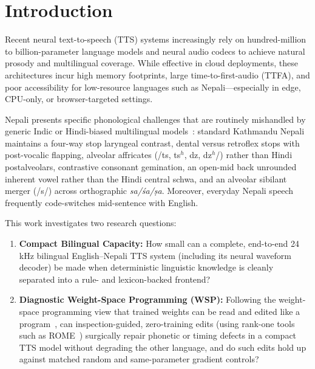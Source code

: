 \section{Introduction}
\label{sec:intro}

Recent neural text-to-speech (TTS) systems increasingly rely on hundred-million to billion-parameter language models and neural audio codecs to achieve natural prosody and multilingual coverage. While effective in cloud deployments, these architectures incur high memory footprints, large time-to-first-audio (TTFA), and poor accessibility for low-resource languages such as Nepali---especially in edge, CPU-only, or browser-targeted settings.

Nepali presents specific phonological challenges that are routinely mishandled by generic Indic or Hindi-biased multilingual models~\cite{khatiwada2009nepali}: standard Kathmandu Nepali maintains a four-way stop laryngeal contrast, dental versus retroflex stops with post-vocalic flapping, alveolar affricates (/ts, ts$^h$, dz, dz$^h$/) rather than Hindi postalveolars, contrastive consonant gemination, an open-mid back unrounded inherent vowel rather than the Hindi central schwa, and an alveolar sibilant merger (/s/) across orthographic \textit{sa/\'{s}a/\d{s}a}. Moreover, everyday Nepali speech frequently code-switches mid-sentence with English.

This work investigates two research questions:
\begin{enumerate}
  \item \textbf{Compact Bilingual Capacity:} How small can a complete, end-to-end 24\,kHz bilingual English--Nepali TTS system (including its neural waveform decoder) be made when deterministic linguistic knowledge is cleanly separated into a rule- and lexicon-backed frontend?
  \item \textbf{Diagnostic Weight-Space Programming (WSP):} Following the weight-space programming view that trained weights can be read and edited like a program~\cite{wsp2026}, can inspection-guided, zero-training edits (using rank-one tools such as ROME~\cite{meng2022rome}) surgically repair phonetic or timing defects in a compact TTS model without degrading the other language, and do such edits hold up against matched random and same-parameter gradient controls?
\end{enumerate}

